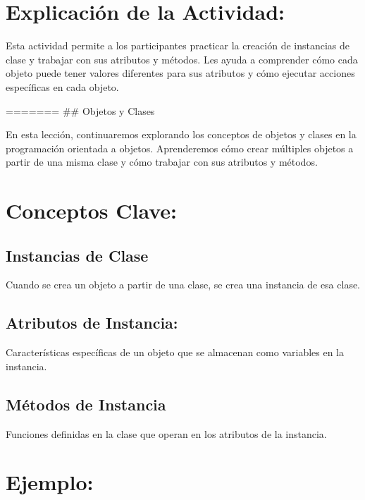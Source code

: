 \documentclass[
  a4paper,
  DIV=11,
  numbers=noendperiod,
  onepage,
  openany]{scrreprt}
\begin{document}
\hypertarget{explicaciuxf3n-de-la-actividad-48}{%
\section{Explicación de la
Actividad:}\label{explicaciuxf3n-de-la-actividad-48}}

Esta actividad permite a los participantes practicar la creación de
instancias de clase y trabajar con sus atributos y métodos. Les ayuda a
comprender cómo cada objeto puede tener valores diferentes para sus
atributos y cómo ejecutar acciones específicas en cada objeto.

======= \#\# Objetos y Clases

En esta lección, continuaremos explorando los conceptos de objetos y
clases en la programación orientada a objetos. Aprenderemos cómo crear
múltiples objetos a partir de una misma clase y cómo trabajar con sus
atributos y métodos.

\hypertarget{conceptos-clave-51}{%
\section{Conceptos Clave:}\label{conceptos-clave-51}}

\hypertarget{instancias-de-clase-1}{%
\subsection{Instancias de Clase}\label{instancias-de-clase-1}}

Cuando se crea un objeto a partir de una clase, se crea una instancia de
esa clase.

\hypertarget{atributos-de-instancia-1}{%
\subsection{Atributos de Instancia:}\label{atributos-de-instancia-1}}

Características específicas de un objeto que se almacenan como variables
en la instancia.

\hypertarget{muxe9todos-de-instancia-1}{%
\subsection{Métodos de Instancia}\label{muxe9todos-de-instancia-1}}

Funciones definidas en la clase que operan en los atributos de la
instancia.

\hypertarget{ejemplo-51}{%
\section{Ejemplo:}\label{ejemplo-51}}
\end{document}
